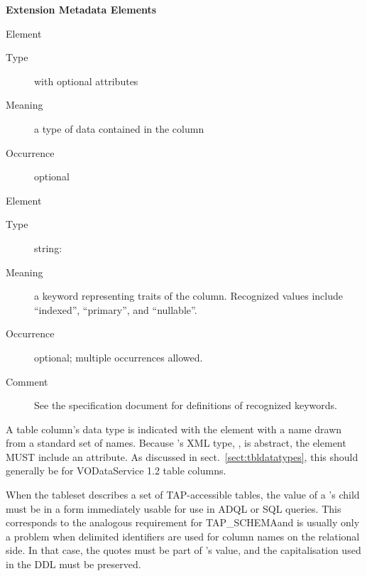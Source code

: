 \documentclass[11pt,a4paper]{ivoa}
\newcommand{\tapschema}{TAP\_SCHE\-MA}
\newcommand{\tapschema}{\mbox{%
  TAP\discretionary{-}{}{\kern-2pt\_}SCHEMA}}
\begin{document}
\begin{generated}
\vspace{0.5ex}\noindent\textbf{ Extension Metadata Elements}

\begingroup\small\begin{bigdescription}\item[Element \xmlel{dataType}]
\begin{description}
\item[Type]  with optional attributes
\item[Meaning] 
                        a type of data contained in the column
                     
\item[Occurrence] optional

\end{description}
\item[Element \xmlel{flag}]
\begin{description}
\item[Type] string: 
\item[Meaning] 
                        a keyword representing traits of the column.  
                        Recognized values include “indexed”, “primary”, and
                        “nullable”.  
                     
\item[Occurrence] optional; multiple occurrences allowed.
\item[Comment] 
                        See the specification document for definitions 
                        of recognized keywords.
                     

\end{description}


\end{bigdescription}\endgroup

\endgroup
\end{generated}



A table column's data type is indicated with the 
element with a name drawn from a standard set of names.  
Because 's
XML type, , is abstract, the
element MUST include an
 attribute.  As discussed in
sect.~\ref{sect:tbldatatypes}, this should generally be
 for VODataService 1.2 table columns.

When the tableset describes a set of TAP-accessible tables, the value of
a 's  child must be in a form immediately
usable for use in ADQL or SQL queries. This corresponds to the analogous
requirement for \tapschema and is usually only a problem when delimited
identifiers are used for column names on the relational side.  In that
case, the quotes must be part of 's value, and the
capitalisation used in the DDL must be preserved.
\end{document}
